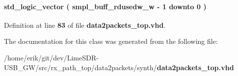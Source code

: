 \paragraph[{smpl\+\_\+buff\+\_\+rdusedw\+\_\+reg}]{ {\bfseries \textcolor{comment}{std\+\_\+logic\+\_\+vector}\textcolor{vhdlchar}{ }\textcolor{vhdlchar}{(}\textcolor{vhdlchar}{ }\textcolor{vhdlchar}{ }\textcolor{vhdlchar}{ }\textcolor{vhdlchar}{ }{\bfseries {\bf smpl\+\_\+buff\+\_\+rdusedw\+\_\+w}} \textcolor{vhdlchar}{-\/}\textcolor{vhdlchar}{ } \textcolor{vhdldigit}{1} \textcolor{vhdlchar}{ }\textcolor{keywordflow}{downto}\textcolor{vhdlchar}{ }\textcolor{vhdlchar}{ } \textcolor{vhdldigit}{0} \textcolor{vhdlchar}{ }\textcolor{vhdlchar}{)}\textcolor{vhdlchar}{ }} \hspace{0.3cm}{\ttfamily [Signal]}}\label{classdata2packets__top_1_1arch_a68c97915f79274981a2576eb72f6c159}


Definition at line {\bf 83} of file {\bf data2packets\+\_\+top.\+vhd}.



The documentation for this class was generated from the following file\+:\begin{DoxyCompactItemize}
\item 
/home/erik/git/dev/\+Lime\+S\+D\+R-\/\+U\+S\+B\+\_\+\+G\+W/src/rx\+\_\+path\+\_\+top/data2packets/synth/{\bf data2packets\+\_\+top.\+vhd}\end{DoxyCompactItemize}
